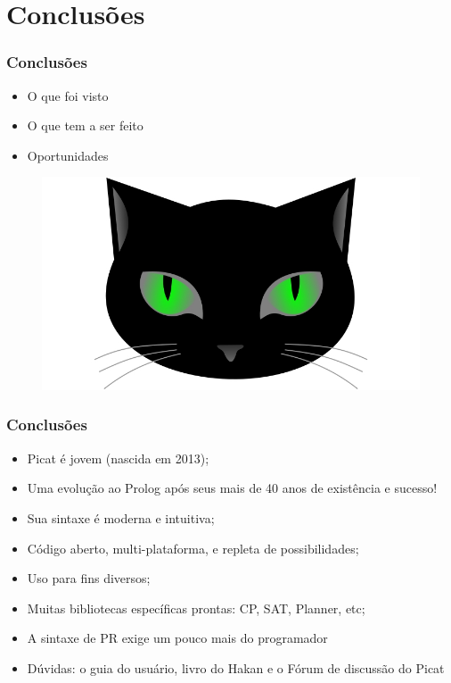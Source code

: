 \section{Conclusões}
\begin{frame}[fragile]
\frametitle{Conclusões}
\begin{minipage}{0.47\textwidth}
    \begin{itemize}
        \item O que foi visto
        \item O que tem a ser feito
        \item Oportunidades
    \end{itemize}
\end{minipage}
\begin{minipage}{0.5\textwidth}
\begin{figure}[ht!]
\begin{center}
\includegraphics[width=1.2\textwidth, height=0.40\textheight]{figures/logo_picat_alex.jpg}
\end{center}
\end{figure}
\end{minipage}
\end{frame}
\begin{frame}[fragile]

    \frametitle{Conclusões}

    \begin{itemize}
      \item Picat é jovem (nascida em 2013); 
      \pause
      \item Uma evolução ao Prolog após seus mais de 40 anos de existência e sucesso!
      \pause
      \item Sua sintaxe é moderna e intuitiva;
      \pause
      \item Código aberto, multi-plataforma, e repleta de possibilidades;
      \pause
      \item Uso para fins diversos;
      \pause
      \item Muitas bibliotecas específicas prontas: CP, SAT, Planner, etc;
      \pause
      \item A sintaxe de PR exige um pouco mais do programador
      \pause
      \item Dúvidas: o guia do usuário, livro do Hakan e o Fórum de discussão do Picat

    \end{itemize}
\end{frame}


